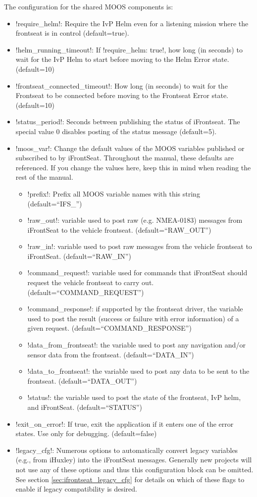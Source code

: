 The configuration for the shared MOOS components is:

\begin{itemize}
\item !require_helm!: Require the IvP Helm even for a listening mission where the frontseat is in control (default=true).
\item !helm_running_timeout!:  If !require_helm: true!, how long (in seconds) to wait for the IvP Helm to start before moving to the Helm Error state. (default=10)
\item !frontseat_connected_timeout!: How long (in seconds) to wait for the Frontseat to be connected before moving to the Frontseat Error state. (default=10)
\item !status_period!: Seconds between publishing the status of iFrontseat. The special value 0 disables posting of the status message (default=5).
\item !moos_var!: Change the default values of the MOOS variables published or subscribed to by iFrontSeat. Throughout the manual, these defaults are referenced. If you change the values here, keep this in mind when reading the rest of the manual.
\begin{itemize}
\item !prefix!: Prefix all MOOS variable names with this string (default=``IFS\_'')
\item !raw_out!: variable used to post raw (e.g. NMEA-0183) messages from iFrontSeat to the vehicle frontseat.  (default=``RAW\_OUT'')
\item !raw_in!: variable used to post raw messages from the vehicle frontseat to iFrontSeat. (default=``RAW\_IN'')
\item !command_request!: variable used for commands that iFrontSeat should request the vehicle frontseat to carry out. (default=``COMMAND\_REQUEST'')
\item !command_response!: if supported by the frontseat driver, the variable used to post the result (success or failure with error information) of a given request. (default=``COMMAND\_RESPONSE'')
\item !data_from_frontseat!: the variable used to post any navigation and/or sensor data from the frontseat. (default=``DATA\_IN'')
\item !data_to_frontseat!: the variable used to post any data to be sent to the frontseat. (default=``DATA\_OUT'')
\item !status!: the variable used to post the state of the frontseat, IvP helm, and iFrontSeat. (default=``STATUS'')
\end{itemize}  
\item !exit_on_error!: If true, exit the application if it enters one of the error states. Use only for debugging. (default=false)
\item !legacy_cfg!: Numerous options to automatically convert legacy variables (e.g., from iHuxley) into the iFrontSeat messages. Generally new projects will not use any of these options and thus this configuration block can be omitted. See section \ref{sec:ifrontseat_legacy_cfg} for details on which of these flags to enable if legacy compatibility is desired.
\end{itemize}

